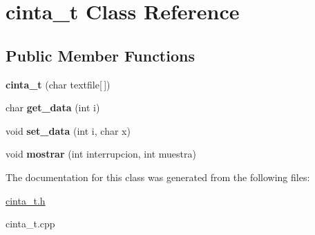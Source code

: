 \hypertarget{classcinta__t}{}\section{cinta\+\_\+t Class Reference}
\label{classcinta__t}
\subsection*{Public Member Functions}
\begin{DoxyCompactItemize}
\item 
\hypertarget{classcinta__t_a20a96f30e4dc2515c64fa9c23782cb92}{}\label{classcinta__t_a20a96f30e4dc2515c64fa9c23782cb92} 
{\bfseries cinta\+\_\+t} (char textfile\mbox{[}$\,$\mbox{]})
\item 
\hypertarget{classcinta__t_a7c40673530cba0d8b9074939d2d44312}{}\label{classcinta__t_a7c40673530cba0d8b9074939d2d44312} 
char {\bfseries get\+\_\+data} (int i)
\item 
\hypertarget{classcinta__t_a8919b8bd22630f4b019c5e98c1b0e70a}{}\label{classcinta__t_a8919b8bd22630f4b019c5e98c1b0e70a} 
void {\bfseries set\+\_\+data} (int i, char x)
\item 
\hypertarget{classcinta__t_a980b096ef1d1eeed962e32ff7d116f74}{}\label{classcinta__t_a980b096ef1d1eeed962e32ff7d116f74} 
void {\bfseries mostrar} (int interrupcion, int muestra)
\end{DoxyCompactItemize}


The documentation for this class was generated from the following files\+:\begin{DoxyCompactItemize}
\item 
\hyperlink{cinta__t_8h}{cinta\+\_\+t.\+h}\item 
cinta\+\_\+t.\+cpp\end{DoxyCompactItemize}
